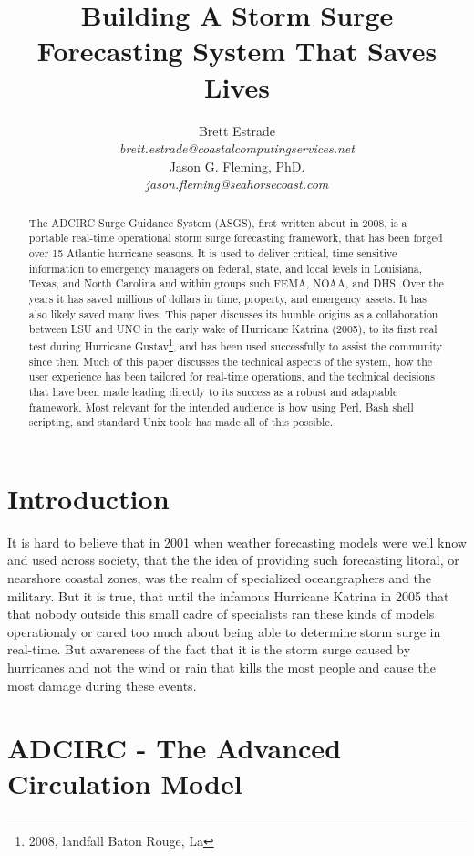 \documentclass{article}
\title{Building A Storm Surge Forecasting System That Saves Lives}
\author{
Brett Estrade \\
\large\textit{brett.estrade@coastalcomputingservices.net}
\\
Jason G. Fleming, PhD. \\
\large\textit{jason.fleming@seahorsecoast.com}
}
\begin{document}
\maketitle

\begin{abstract}
The ADCIRC Surge Guidance System (ASGS), first written about in
2008\cite{fleming2008real}, is a portable real-time operational storm surge
forecasting framework, that has been forged over 15 Atlantic hurricane seasons.
It is used to deliver critical, time sensitive information to emergency managers
on federal, state, and local levels in Louisiana, Texas, and North Carolina and
within groups such FEMA, NOAA, and DHS. Over the years it has saved millions of
dollars in time, property, and emergency assets. It has also likely saved many
lives. This paper discusses its humble origins as a collaboration between LSU
and UNC in the early wake of Hurricane Katrina (2005), to its first real test
during Hurricane Gustav\footnote{2008, landfall Baton Rouge, La}, and has been
used successfully to assist the community since then.  Much of this paper
discusses the technical aspects of the system, how the user experience has been
tailored for real-time operations, and the technical decisions that have been
made leading directly to its success as a robust and adaptable framework. Most
relevant for the intended audience is how using Perl, Bash shell scripting, and
standard Unix tools has made all of this possible.
\end{abstract}

\section{Introduction}

It is hard to believe that in 2001 when weather forecasting models were well
know and used across society, that the the idea of providing such forecasting
litoral, or nearshore coastal zones, was the realm of specialized oceangraphers
and the military. But it is true, that until the infamous Hurricane Katrina in
2005 that that nobody outside this small cadre of specialists ran these kinds of
models operationaly or cared too much about being able to determine storm surge
in real-time. But awareness of the fact that it is the storm surge caused by
hurricanes and not the wind or rain that kills the most people and cause the
most damage during these events.

\section{ADCIRC - The Advanced Circulation Model}
\end{document}
